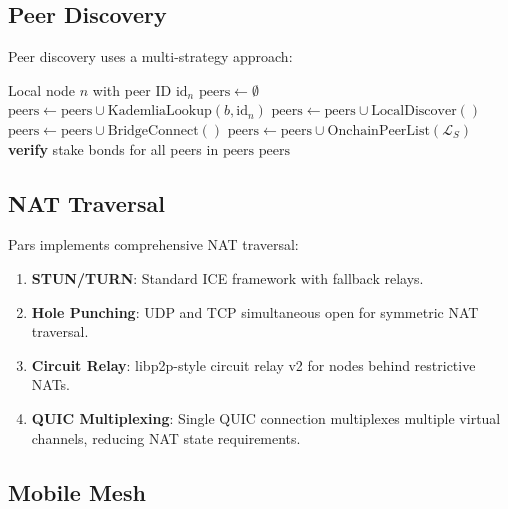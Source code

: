 \documentclass[11pt,a4paper,twocolumn]{article}
\begin{document}
\subsection{Peer Discovery}

Peer discovery uses a multi-strategy approach:

\begin{algorithm}[H]
\caption{Pars Peer Discovery}
\label{alg:peer-discovery}
\begin{algorithmic}[1]
\REQUIRE Local node $n$ with peer ID $\text{id}_n$
\STATE $\text{peers} \gets \emptyset$
  \STATE $\text{peers} \gets \text{peers} \cup \text{KademliaLookup}(b, \text{id}_n)$
\ENDFOR
{}
\STATE $\text{peers} \gets \text{peers} \cup \text{LocalDiscover}()$
  \STATE $\text{peers} \gets \text{peers} \cup \text{BridgeConnect}()$
\ENDIF
{}
\STATE $\text{peers} \gets \text{peers} \cup \text{OnchainPeerList}(\mathcal{L}_S)$
\STATE \textbf{verify} stake bonds for all peers in $\text{peers}$
\RETURN $\text{peers}$
\end{algorithmic}
\end{algorithm}

\subsection{NAT Traversal}

Pars implements comprehensive NAT traversal:

\begin{enumerate}[leftmargin=*]
  \item \textbf{STUN/TURN}: Standard ICE framework with fallback relays.
  \item \textbf{Hole Punching}: UDP and TCP simultaneous open for symmetric NAT traversal.
  \item \textbf{Circuit Relay}: libp2p-style circuit relay v2 for nodes behind restrictive NATs.
  \item \textbf{QUIC Multiplexing}: Single QUIC connection multiplexes multiple virtual channels, reducing NAT state requirements.
\end{enumerate}

\subsection{Mobile Mesh}
\end{document}
